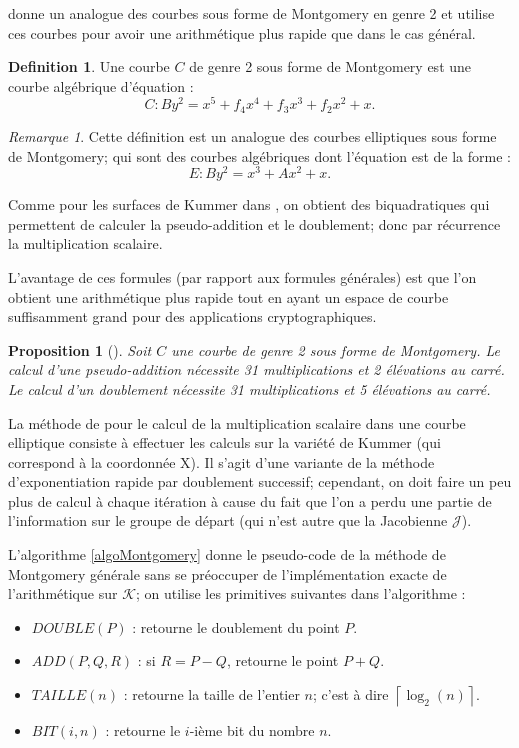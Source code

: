 \documentclass[a4paper]{article}
\newtheorem{proposition}[theoreme]{Proposition}
\theoremstyle{definition}
\newtheorem{definition}{Definition}[section]
\theoremstyle{remark}
\newtheorem{remarque}{Remarque}
\numberwithin{equation}{section}
\begin{document}
\citet{duquesne} donne un analogue des courbes sous forme de Montgomery en genre 2 et utilise ces courbes pour avoir une arithmétique plus rapide que dans le cas général.

\begin{definition}
Une courbe $C$ de genre 2 sous forme de Montgomery est une courbe algébrique d'équation :
$$C : By^2 = x^5 + f_4x^4 + f_3x^3 + f_2x^2 + x.$$
\end{definition}

\begin{remarque}
Cette définition est un analogue des courbes elliptiques sous forme de Montgomery; qui sont des courbes algébriques dont l'équation est de la forme :
$$E : By^2 = x^3 + Ax^2 + x.$$
\end{remarque}

Comme pour les surfaces de Kummer dans \citep{cassels-Flynn}, on obtient des biquadratiques qui permettent de calculer la pseudo-addition et le doublement; donc par récurrence la multiplication scalaire.

L'avantage de ces formules (par rapport aux formules générales) est que l'on obtient une arithmétique plus rapide tout en ayant un espace de courbe suffisamment grand pour des applications cryptographiques.

\begin{proposition}[\citet{duquesne}]
\label{propDuquesne}
Soit $C$ une courbe de genre 2 sous forme de Montgomery. Le calcul d'une pseudo-addition nécessite 31 multiplications et 2 élévations au carré. Le calcul d'un doublement nécessite 31 multiplications et 5 élévations au carré.
\end{proposition}

La méthode de \citet{montgomery} pour le calcul de la multiplication scalaire dans une courbe elliptique consiste à effectuer les calculs sur la variété de Kummer (qui correspond à la coordonnée X). Il s'agit d'une variante de la méthode d'exponentiation rapide par doublement successif; cependant, on doit faire un peu plus de calcul à chaque itération à cause du fait que l'on a perdu une partie de l'information sur le groupe de départ (qui n'est autre que la Jacobienne $\mathcal{J}$).

L'algorithme \ref{algoMontgomery} donne le pseudo-code de la méthode de Montgomery générale sans se préoccuper de l'implémentation exacte de l'arithmétique sur $\mathcal{K}$; on utilise les primitives suivantes dans l'algorithme :
\begin{itemize}
\item $DOUBLE(P)$ : retourne le doublement du point $P$.
\item $ADD(P,Q,R)$ : si $R = P-Q$, retourne le point $P+Q$.
\item $TAILLE(n)$ : retourne la taille de l'entier $n$; c'est à dire $\left \lceil{\log_2(n)}\right \rceil$.
\item $BIT(i,n)$ : retourne le $i$-ième bit du nombre $n$.
\end{itemize}
\end{document}
